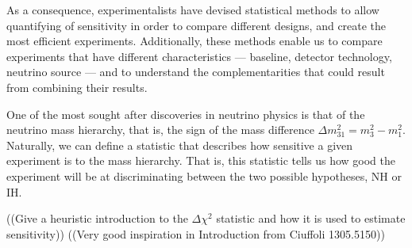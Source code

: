 \documentclass[10pt, a4paper]{article}
\begin{document}
As a consequence, experimentalists have devised statistical methods to allow
quantifying of sensitivity in order to compare different designs,
and create the most efficient experiments.
Additionally, these methods enable us to compare experiments that have
different characteristics --- baseline, detector technology, neutrino source
--- and to understand the complementarities that could result from combining
their results.


One of the most sought after discoveries in neutrino physics is that of the neutrino
mass hierarchy, that is, the sign of the mass difference $\Delta m^2_{31} =
m^2_3 - m^2_1$. Naturally, we can define a statistic that describes how
sensitive a given experiment is to the mass hierarchy. That is, this
statistic tells us how good the experiment will be at discriminating
between the two possible hypotheses, NH or IH.

((Give a heuristic introduction to the $\Delta \chi^2$ statistic and how it is
used to estimate sensitivity))
((Very good inspiration in Introduction from Ciuffoli 1305.5150))
\end{document}
